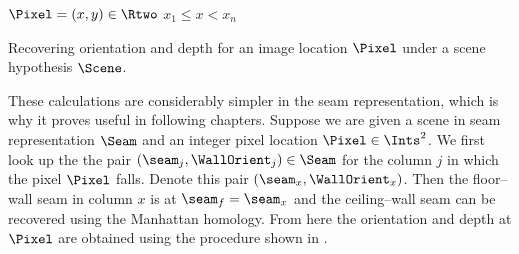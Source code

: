 \begin{algorithm}[tb]
  \begin{algorithmic}
    \REQUIRE $\Pixel=(x,y)\in\Rtwo$
    \REQUIRE $x_1 \leq x < x_n$
        \STATE{}
        \ELSE
        \ENDIF
        \RETURN
      \ENDIF
    \ENDFOR
  \end{algorithmic}
  \caption{\label{alg:computing-from-scene}
    Recovering orientation and depth for an image location
    $\Pixel$ under a scene hypothesis $\Scene$.}
\end{algorithm}

These calculations are considerably simpler in the seam
representation, which is why it proves useful in following
chapters. Suppose we are given a scene in seam representation $\Seam$
and an integer pixel location $\Pixel\in\Ints^2$. We first look up the
the pair $(\seam_j,\WallOrient_j)\in\Seam$ for the column $j$ in which the
pixel $\Pixel$ falls. Denote this pair
$(\seam_x,\WallOrient_x)$. Then the floor--wall seam in column
$x$ is at $\seam_f=\seam_x$ and the ceiling--wall seam
can be recovered using the Manhattan homology. From here the
orientation and depth at $\Pixel$ are obtained using the procedure
shown in .

